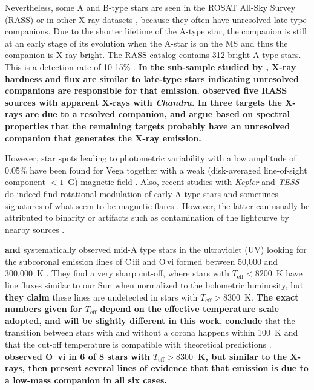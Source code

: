 \documentclass[linenumbers]{aastex631}
\begin{document}
Nevertheless, some A and B-type stars  are seen in the ROSAT
All-Sky Survey (RASS) or in other X-ray datasets \citep{2020ApJ...902..114W}, because they often have unresolved late-type
companions. Due to the shorter lifetime of the A-type star, the companion is
still at an early stage of its evolution when the A-star is on the MS and thus the companion is X-ray bright. The RASS
catalog contains 312 bright A-type stars. This is a detection rate of 10-15\% \citep{2007A&A...475..677S}. 
\textbf{In the sub-sample studied by \citet{2000A&A...359..227H}, X-ray hardness and flux are similar to late-type stars indicating unresolved companions are responsible for that emission. \citet{2003A&A...407.1067S} observed five RASS sources with apparent X-rays with \emph{Chandra}. In three targets the X-rays are due to a resolved companion, and \citet{2003A&A...407.1067S} argue based on spectral properties that the remaining targets probably have an unresolved companion that generates the X-ray emission.}


However, star spots leading to photometric variability with a low amplitude of 0.05\% have been found for Vega \citep{2015A&A...577A..64B} together with a weak (disk-averaged line-of-sight component $< 1$~G) magnetic field \citep{2009A&A...500L..41L,2010A&A...523A..41P}.
Also, recent studies with \emph{Kepler} and \emph{TESS} do indeed find rotational modulation of early A-type stars \citep{2011MNRAS.415.1691B,2017MNRAS.467.1830B,
2019MNRAS.487.4695S} and sometimes signatures of what seem to be magnetic flares \citep{2012MNRAS.423.3420B}. However, the latter can usually be attributed to binarity or artifacts such as contamination of the lightcurve by nearby sources \citep{2017MNRAS.466.3060P}.

\cite{2002ApJ...579..800S} \textbf{and \citet{2008ApJ...685..478N}} systematically observed mid-A type stars in the ultraviolet (UV)
looking for the subcoronal emission lines
of C\,{\sc iii} and O\,{\sc vi} formed between 50,000 and 300,000~K \citep{1997A&AS..125..149D,2021ApJ...909...38D}. They find a
very sharp cut-off, where stars with $T_\mathrm{eff}<8200$~K have line fluxes similar to our Sun \citep{1997JGR...102.1641A} when normalized to the bolometric
luminosity, but \textbf{they claim} these lines are undetected in stars with $T_\mathrm{eff} > 8300$~K.
\textbf{The exact numbers given for $T_\mathrm{eff}$ depend on the effective temperature scale adopted, and will be slightly different in this work.}
\citet{2002ApJ...579..800S} \textbf{conclude} that the
transition between stars with and without a corona happens within 100~K and that the cut-off temperature is compatible with theoretical predictions \citep{2000ASPC..210..187C,2002MNRAS.330L...6K}.
\textbf{\citet{2008ApJ...685..478N} observed O~{\sc vi} in 6 of 8 stars with  $T_\mathrm{eff}>8300$~K, but similar to the X-rays, then present several lines of evidence that that emission is due to a low-mass companion in all six cases.}
\end{document}
